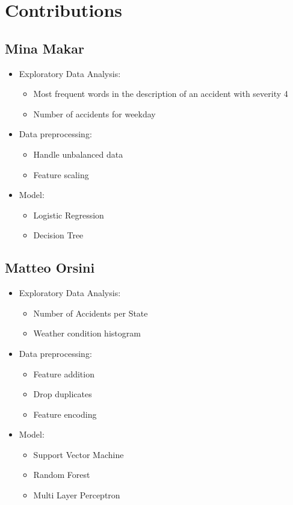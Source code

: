 \documentclass{article}
\begin{document}
\section{Contributions}

\subsection*{Mina Makar}
\begin{itemize}
\item Exploratory Data Analysis:
	\begin{itemize}
	\item Most frequent words in the description of an accident with severity 4
	\item Number of accidents for weekday
	\end{itemize}
\item Data preprocessing:
	\begin{itemize}
	\item Handle unbalanced data
	\item Feature scaling
	\end{itemize}
\item Model:
	\begin{itemize}
	\item Logistic Regression
	\item Decision Tree
	\end{itemize}
\end{itemize}

\subsection*{Matteo Orsini}
\begin{itemize}
\item Exploratory Data Analysis:
	\begin{itemize}
	\item Number of Accidents per State
	\item Weather condition histogram
	\end{itemize}
\item Data preprocessing:
	\begin{itemize}
	\item Feature addition
	\item Drop duplicates
	\item Feature encoding
	\end{itemize}
\item Model:
	\begin{itemize}
	\item Support Vector Machine
	\item Random Forest
	\item Multi Layer Perceptron
	\end{itemize}
\end{itemize}
\end{document}
